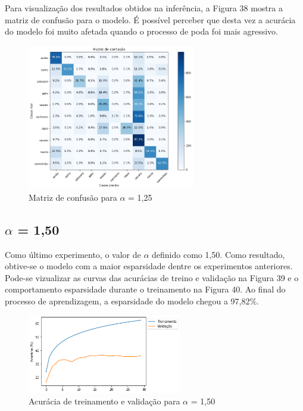 Para visualização dos resultados obtidos na inferência, a Figura 38 mostra a matriz de confusão para o modelo. É possível perceber que desta vez a acurácia do modelo foi muito afetada quando o processo de poda foi mais agressivo.

\begin{figure}[H]
	\includegraphics[width=0.65\textwidth, keepaspectratio=true]{figuras/CAP4/cm125_.png}
	\centering
	\caption[Matriz de confusão para $\alpha$ = 1,25]{Matriz de confusão para $\alpha$ = 1,25}
\end{figure}



\subsection{$\alpha$ = 1,50}
Como último experimento, o valor de $\alpha$ definido como 1,50. Como resultado, obtive-se o modelo com a maior esparsidade dentre os experimentos anteriores. Pode-se vizualizar as curvas das acurácias de treino e validação na Figura 39 e o comportamento esparsidade durante o treinamento na Figura 40. Ao final do processo de aprendizagem, a esparsidade do modelo chegou a 97,82\%.


\begin{figure}[H]
	\includegraphics[width=0.6\textwidth, keepaspectratio=true]{figuras/CAP4/acuracia150.png}
	\centering
	\caption[Acurácia de treinamento e validação para $\alpha$ = 1,50]{Acurácia de treinamento e validação para $\alpha$ = 1,50}
\end{figure}

